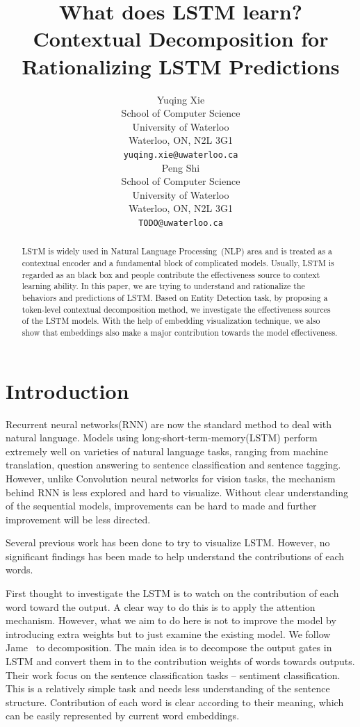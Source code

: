 \documentclass{article}
\title{What does LSTM learn? Contextual Decomposition for Rationalizing LSTM Predictions}
\author{
	Yuqing Xie \\
	School of Computer Science\\
	University of Waterloo\\
	Waterloo, ON, N2L 3G1 \\
	\texttt{yuqing.xie@uwaterloo.ca} \\
	\And
	Peng Shi\\
	School of Computer Science\\
	University of Waterloo\\
	Waterloo, ON, N2L 3G1 \\
	\texttt{TODO@uwaterloo.ca} \\
}
\begin{document}
\maketitle


\begin{abstract}

LSTM is widely used in Natural Language Processing~(NLP) area and is treated as a contextual encoder and a fundamental block of complicated models. Usually, LSTM is regarded as an black box and people contribute the effectiveness source to context learning ability. In this paper, we are trying to understand and rationalize the behaviors and predictions of LSTM. Based on Entity Detection task, by proposing a token-level contextual decomposition method, we investigate the effectiveness sources of the LSTM models. With the help of embedding visualization technique, we also show that embeddings also make a major contribution towards the model effectiveness.

\end{abstract}

\section{Introduction}

Recurrent neural networks(RNN) are now the standard method to deal with natural language. Models using long-short-term-memory(LSTM) perform extremely well on varieties of natural language tasks, ranging from machine translation, question answering to sentence classification and sentence tagging. However, unlike Convolution neural networks for vision tasks, the mechanism behind RNN is less explored and hard to visualize. Without clear understanding of the sequential models, improvements can be hard to made and further improvement will be less directed. 

Several previous work has been done to try to visualize LSTM. However, no significant findings has been made to help understand the contributions of each words. 

First thought to investigate the LSTM is to watch on the contribution of each word toward the output. A clear way to do this is to apply the attention mechanism. However, what we aim to do here is not to improve the model by introducing extra weights but to just examine the existing model. We follow Jame~\cite{james2018beyond} to decomposition. The main idea is to decompose the output gates in LSTM and convert them in to the contribution weights of words towards outputs. Their work focus on the sentence classification tasks -- sentiment classification. This is a relatively simple task and needs less understanding of the sentence structure. Contribution of each word is clear according to their meaning, which can be easily represented by current word embeddings. 
\end{document}
